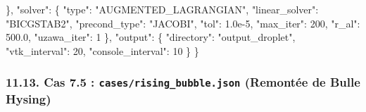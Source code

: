 \documentclass[
  french,
]{article}
\newenvironment{Shaded}{}{}
\newcommand{\DataTypeTok}[1]{\textcolor[rgb]{0.56,0.13,0.00}{#1}}
\newcommand{\DecValTok}[1]{\textcolor[rgb]{0.25,0.63,0.44}{#1}}
\newcommand{\FloatTok}[1]{\textcolor[rgb]{0.25,0.63,0.44}{#1}}
\newcommand{\FunctionTok}[1]{\textcolor[rgb]{0.02,0.16,0.49}{#1}}
\newcommand{\StringTok}[1]{\textcolor[rgb]{0.25,0.44,0.63}{#1}}
\begin{document}
\begin{Shaded}
\begin{Highlighting}[]
  \FunctionTok{\},}
  \DataTypeTok{"solver"}\FunctionTok{:} \FunctionTok{\{}
    \DataTypeTok{"type"}\FunctionTok{:} \StringTok{"AUGMENTED\_LAGRANGIAN"}\FunctionTok{,}
    \DataTypeTok{"linear\_solver"}\FunctionTok{:} \StringTok{"BICGSTAB2"}\FunctionTok{,}
    \DataTypeTok{"precond\_type"}\FunctionTok{:} \StringTok{"JACOBI"}\FunctionTok{,}
    \DataTypeTok{"tol"}\FunctionTok{:} \FloatTok{1.0e{-}5}\FunctionTok{,} \DataTypeTok{"max\_iter"}\FunctionTok{:} \DecValTok{200}\FunctionTok{,} \DataTypeTok{"r\_al"}\FunctionTok{:} \FloatTok{500.0}\FunctionTok{,} \DataTypeTok{"uzawa\_iter"}\FunctionTok{:} \DecValTok{1}
  \FunctionTok{\},}
  \DataTypeTok{"output"}\FunctionTok{:} \FunctionTok{\{} \DataTypeTok{"directory"}\FunctionTok{:} \StringTok{"output\_droplet"}\FunctionTok{,} \DataTypeTok{"vtk\_interval"}\FunctionTok{:} \DecValTok{20}\FunctionTok{,} \DataTypeTok{"console\_interval"}\FunctionTok{:} \DecValTok{10} \FunctionTok{\}}
\FunctionTok{\}}
\end{Highlighting}
\end{Shaded}

\subsubsection{\texorpdfstring{11.13. Cas 7.5 :
\texttt{cases/rising\_bubble.json} (Remontée de Bulle
Hysing)}{11.13. Cas 7.5 : cases/rising\_bubble.json (Remontée de Bulle Hysing)}}\label{cas-7.5-casesrising_bubble.json-remontuxe9e-de-bulle-hysing}
\end{document}
